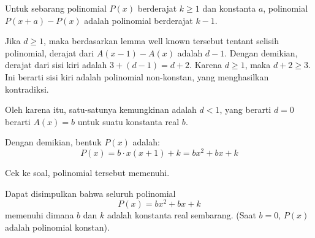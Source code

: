 \begin{lemma*}
Untuk sebarang polinomial $P(x)$ berderajat $k \ge 1$ dan konstanta $a$, polinomial $P(x+a)-P(x)$ adalah polinomial berderajat $k-1$.
\end{lemma*}

Jika $d \ge 1$, maka berdasarkan lemma well known tersebut tentant selisih polinomial, derajat dari $A(x-1)-A(x)$ adalah $d-1$. Dengan demikian, derajat dari sisi kiri adalah $3 + (d-1) = d+2$. Karena $d \ge 1$, maka $d+2 \ge 3$. Ini berarti sisi kiri adalah polinomial non-konstan, yang menghasilkan kontradiksi.
 
Oleh karena itu, satu-satunya kemungkinan adalah $d < 1$, yang berarti $d=0$ berarti $A(x)=b$ untuk suatu konstanta real $b$.

Dengan demikian, bentuk $P(x)$ adalah:
\[ P(x) = b \cdot x(x+1) + k = bx^2 + bx + k \]

Cek ke soal, polinomial tersebut memenuhi.

Dapat disimpulkan bahwa seluruh polinomial
\[ P(x) = bx^2 + bx + k \]
memenuhi dimana $b$ dan $k$ adalah konstanta real sembarang. (Saat $b=0$, $P(x)$ adalah polinomial konstan).